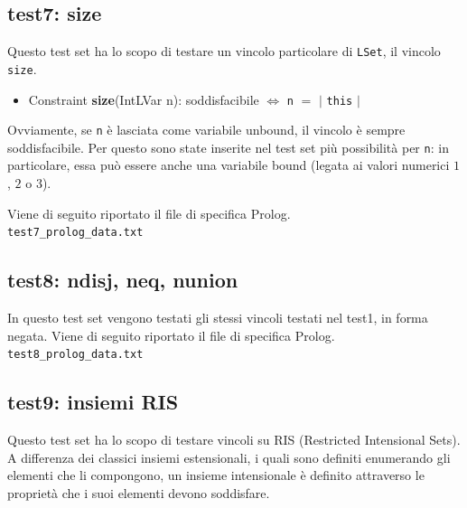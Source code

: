 \subsection{test7: size}
Questo test set ha lo scopo di testare un vincolo particolare di \texttt{LSet}, il vincolo \texttt{size}.\\

\begin{itemize}
\item Constraint \textbf{size}(IntLVar n): soddisfacibile $\iff$ \texttt{n} $=$ $|$ \texttt{this} $|$
\end{itemize}

Ovviamente, se \texttt{n} è lasciata come variabile unbound, il vincolo è sempre soddisfacibile. Per questo sono state inserite nel test set più possibilità per \texttt{n}: in particolare, essa può essere anche una variabile bound (legata ai valori numerici $1$, $2$ o $3$).

Viene di seguito riportato il file di specifica Prolog.\\

\texttt{test7\_prolog\_data.txt}


%

\subsection{test8: ndisj, neq, nunion}
In questo test set vengono testati gli stessi vincoli testati nel test1, in forma negata. Viene di seguito riportato il file di specifica Prolog.\\

\texttt{test8\_prolog\_data.txt}


%

\clearpage

\subsection{test9: insiemi RIS}
Questo test set ha lo scopo di testare vincoli su RIS (Restricted Intensional Sets).
A differenza dei classici insiemi estensionali, i quali sono definiti enumerando gli elementi che li compongono, un insieme intensionale è definito attraverso le proprietà che i suoi elementi devono soddisfare.\\

